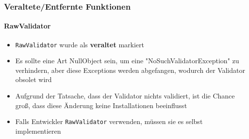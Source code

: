 %
%
%
%
%
%
%
%
%


\begin{frame}[fragile]
	\frametitle{Veraltete/Entfernte Funktionen}
	\framesubtitle{RawValidator}

	\begin{itemize}
		\item \texttt{RawValidator} wurde als \textbf{veraltet} markiert
		\item Es sollte eine Art NullObject sein, um eine "NoSuchValidatorException" zu verhindern,
			aber diese Exceptions werden abgefangen, wodurch der Validator obsolet wird
		\item Aufgrund der Tatsache, dass der Validator nichts validiert,
			ist die Chance groß, dass diese Änderung keine Installationen beeinflusst
		\item Falls Entwickler \texttt{RawValidator} verwenden, müssen sie es selbst implementieren
	\end{itemize}


\end{frame}

